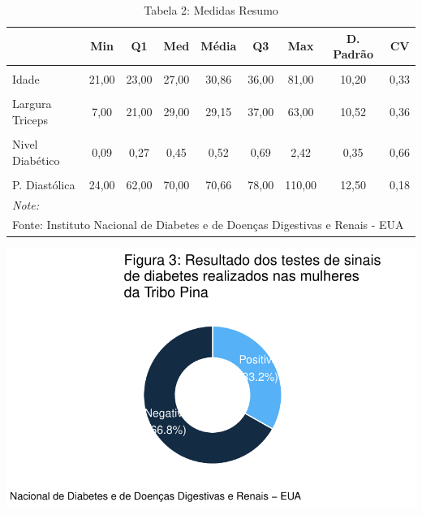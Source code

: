 \documentclass[
  letterpaper,
  DIV=11,
  numbers=noendperiod]{scrartcl}
\begin{document}
\begin{table}

\caption{\label{tab:unnamed-chunk-7}Tabela 2: Medidas Resumo}
\centering
\begin{tabular}[t]{l|c|c|c|c|c|c|c|c}
\hline
  & Min & Q1 & Med & Média & Q3 & Max & D. Padrão & CV\\
\hline
\cellcolor{TRUE}{Glicose} & \cellcolor{TRUE}{56,00} & \cellcolor{TRUE}{99,00} & \cellcolor{TRUE}{119,00} & \cellcolor{TRUE}{122,63} & \cellcolor{TRUE}{143,00} & \cellcolor{TRUE}{198,00} & \cellcolor{TRUE}{30,86} & \cellcolor{TRUE}{0,25}\\
\hline
Idade & 21,00 & 23,00 & 27,00 & 30,86 & 36,00 & 81,00 & 10,20 & 0,33\\
\hline
\cellcolor{TRUE}{IMC} & \cellcolor{TRUE}{18,20} & \cellcolor{TRUE}{28,40} & \cellcolor{TRUE}{33,20} & \cellcolor{TRUE}{33,09} & \cellcolor{TRUE}{37,10} & \cellcolor{TRUE}{67,10} & \cellcolor{TRUE}{7,03} & \cellcolor{TRUE}{0,21}\\
\hline
Largura Triceps & 7,00 & 21,00 & 29,00 & 29,15 & 37,00 & 63,00 & 10,52 & 0,36\\
\hline
\cellcolor{TRUE}{N° de Gestações} & \cellcolor{TRUE}{0,00} & \cellcolor{TRUE}{1,00} & \cellcolor{TRUE}{2,00} & \cellcolor{TRUE}{3,30} & \cellcolor{TRUE}{5,00} & \cellcolor{TRUE}{17,00} & \cellcolor{TRUE}{3,21} & \cellcolor{TRUE}{0,97}\\
\hline
Nivel Diabético & 0,09 & 0,27 & 0,45 & 0,52 & 0,69 & 2,42 & 0,35 & 0,66\\
\hline
\cellcolor{TRUE}{Nível Insulina} & \cellcolor{TRUE}{14,00} & \cellcolor{TRUE}{76,50} & \cellcolor{TRUE}{125,50} & \cellcolor{TRUE}{156,06} & \cellcolor{TRUE}{190,00} & \cellcolor{TRUE}{846,00} & \cellcolor{TRUE}{118,84} & \cellcolor{TRUE}{0,76}\\
\hline
P. Diastólica & 24,00 & 62,00 & 70,00 & 70,66 & 78,00 & 110,00 & 12,50 & 0,18\\
\hline
\multicolumn{9}{l}{\rule{0pt}{1em}\textit{Note: }}\\
\multicolumn{9}{l}{\rule{0pt}{1em}Fonte: Instituto Nacional de Diabetes e de Doenças Digestivas e Renais - EUA}\\
\end{tabular}
\end{table}

\includegraphics{relatorio_lab1_files/figure-pdf/unnamed-chunk-8-1.pdf}
\end{document}
